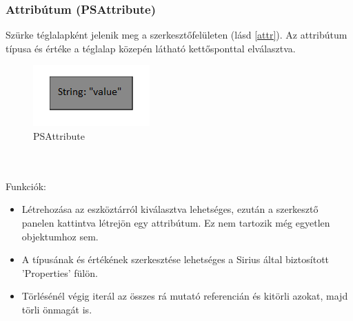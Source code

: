 \subsubsection{Attribútum (PSAttribute)}
Szürke téglalapként jelenik meg a szerkesztőfelületen (lásd \autoref{attr}). Az attribútum típusa és értéke a téglalap közepén látható kettősponttal elválasztva.
\begin{figure}[!ht]
	\centering
	\includegraphics{figures/attr.PNG}
	\caption{PSAttribute}
	\label{attr} 
\end{figure}
\\\\
Funkciók:
\begin{itemize}  	
	\item Létrehozása az eszköztárról kiválasztva lehetséges, ezután a szerkesztő panelen kattintva létrejön egy attribútum. Ez nem tartozik még egyetlen objektumhoz sem.
	
	\item A típusának és értékének szerkesztése lehetséges a Sirius által biztosított 'Properties' fülön.
	
	\item Törlésénél végig iterál az összes rá mutató referencián és kitörli azokat, majd törli önmagát is.	

\end{itemize}

